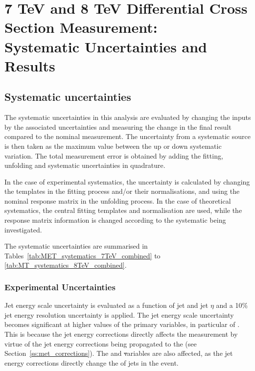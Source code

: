 \chapter{7 TeV and 8 TeV Differential Cross Section Measurement: \\ Systematic Uncertainties and Results}
\label{c:Differential_Cross_Section:systematics_and_results}

\section{Systematic uncertainties}
\label{s:systematic_uncertainties}
The systematic uncertainties in this analysis are evaluated by changing the inputs by the associated
uncertainties and measuring the change in the final result compared to the nominal measurement. The
uncertainty from a systematic source is then taken as the maximum value between the up or down systematic
variation. The total measurement error is obtained by adding the fitting, unfolding and systematic uncertainties in
quadrature.

In the case of experimental systematics, the uncertainty is calculated by changing the templates in the
fitting process and/or their normalisations, and using the nominal \MADGRAPH response matrix in the unfolding
process. In the case of theoretical systematics, the central fitting templates and normalisation are used,
while the response matrix information is changed according to the systematic being investigated.

The systematic uncertainties are summarised in Tables~\ref{tab:MET_systematics_7TeV_combined} to
\ref{tab:MT_systematics_8TeV_combined}.

\subsection{Experimental Uncertainties}
\label{ss:experimental_uncertainties}

Jet energy scale uncertainty is evaluated as a function of jet \pt and jet $\eta$ and a 10\% jet energy
resolution uncertainty is applied. The jet energy scale uncertainty becomes significant at higher values of
the primary variables, in particular of \met. This is because the jet energy corrections directly
affects the \met measurement by virtue of the jet energy corrections being propagated to the \met (see
Section~\ref{ss:met_corrections}). The \HT and \st variables are also affected, as the jet energy corrections
directly change the \pt of jets in the event.

